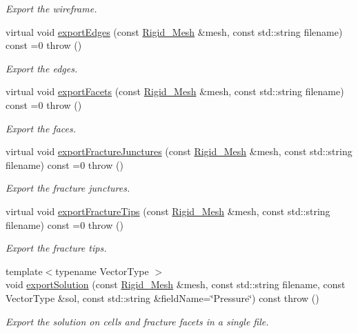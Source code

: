 \begin{DoxyCompactItemize}
\begin{DoxyCompactList}\small\item\em Export the wireframe. \end{DoxyCompactList}\item 
virtual void \hyperlink{classFVCode3D_1_1Exporter_ae45f5362d7840934144052a30b364df9}{export\+Edges} (const \hyperlink{classFVCode3D_1_1Rigid__Mesh}{Rigid\+\_\+\+Mesh} \&mesh, const std\+::string filename) const =0  throw ()
\begin{DoxyCompactList}\small\item\em Export the edges. \end{DoxyCompactList}\item 
virtual void \hyperlink{classFVCode3D_1_1Exporter_a4dfcb0e6cae851c226cb5aed441bb66c}{export\+Facets} (const \hyperlink{classFVCode3D_1_1Rigid__Mesh}{Rigid\+\_\+\+Mesh} \&mesh, const std\+::string filename) const =0  throw ()
\begin{DoxyCompactList}\small\item\em Export the faces. \end{DoxyCompactList}\item 
virtual void \hyperlink{classFVCode3D_1_1Exporter_ac905e24987d7b9d0b8e6aab739361bef}{export\+Fracture\+Junctures} (const \hyperlink{classFVCode3D_1_1Rigid__Mesh}{Rigid\+\_\+\+Mesh} \&mesh, const std\+::string filename) const =0  throw ()
\begin{DoxyCompactList}\small\item\em Export the fracture junctures. \end{DoxyCompactList}\item 
virtual void \hyperlink{classFVCode3D_1_1Exporter_a98c3d2800090caa7c7249ce802dd8792}{export\+Fracture\+Tips} (const \hyperlink{classFVCode3D_1_1Rigid__Mesh}{Rigid\+\_\+\+Mesh} \&mesh, const std\+::string filename) const =0  throw ()
\begin{DoxyCompactList}\small\item\em Export the fracture tips. \end{DoxyCompactList}\item 
{\footnotesize template$<$typename Vector\+Type $>$ }\\void \hyperlink{classFVCode3D_1_1Exporter_a7902cd61f1d122b4ac8ed2c1d1da700c}{export\+Solution} (const \hyperlink{classFVCode3D_1_1Rigid__Mesh}{Rigid\+\_\+\+Mesh} \&mesh, const std\+::string filename, const Vector\+Type \&sol, const std\+::string \&field\+Name=\char`\"{}Pressure\char`\"{}) const   throw ()
\begin{DoxyCompactList}\small\item\em Export the solution on cells and fracture facets in a single file. \end{DoxyCompactList}\item 

\end{DoxyCompactItemize}
